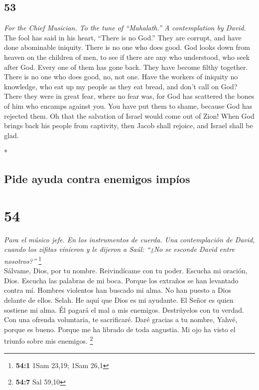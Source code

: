 \begin{paracol}{2}
\switchcolumn
\begin{otherlanguage}{english}

\hypertarget{section-105}{%
\section{53}\label{section-105}}

\emph{For the Chief Musician. To the tune of ``Mahalath.'' A
contemplation by David.}\\
 The fool has said in his heart, ``There is no God.'' They
are corrupt, and have done abominable iniquity. There is no one who does
good.  God looks down from heaven on the children of men,
to see if there are any who understood, who seek after God.
 Every one of them has gone back. They have become filthy
together. There is no one who does good, no, not one. 
Have the workers of iniquity no knowledge, who eat up my people as they
eat bread, and don't call on God?  There they were in
great fear, where no fear was, for God has scattered the bones of him
who encamps against you. You have put them to shame, because God has
rejected them.  Oh that the salvation of Israel would come
out of Zion! When God brings back his people from captivity, then Jacob
shall rejoice, and Israel shall be glad.

\end{otherlanguage}

\switchcolumn[0]*

\hypertarget{pide-ayuda-contra-enemigos-impuxedos}{%
\subsection{Pide ayuda contra enemigos
impíos}\label{pide-ayuda-contra-enemigos-impuxedos}}

\hypertarget{section-106}{%
\section{54}\label{section-106}}

\emph{Para el músico jefe. En los instrumentos de cuerda. Una
contemplación de David, cuando los zifitas vinieron y le dijeron a Saúl:
``¿No se esconde David entre nosotros?''} \footnote{\textbf{54:1} 1Sam
  23,19; 1Sam 26,1}\\
 Sálvame, Dios, por tu nombre. Reivindícame con tu poder.
 Escucha mi oración, Dios. Escucha las palabras de mi
boca.  Porque los extraños se han levantado contra mí.
Hombres violentos han buscado mi alma. No han puesto a Dios delante de
ellos. Selah.  He aquí que Dios es mi ayudante. El Señor
es quien sostiene mi alma.  Él pagará el mal a mis
enemigos. Destrúyelos con tu verdad.  Con una ofrenda
voluntaria, te sacrificaré. Daré gracias a tu nombre, Yahvé, porque es
bueno.  Porque me ha librado de toda angustia. Mi ojo ha
visto el triunfo sobre mis enemigos. \footnote{\textbf{54:7} Sal 59,10}


\end{paracol}
